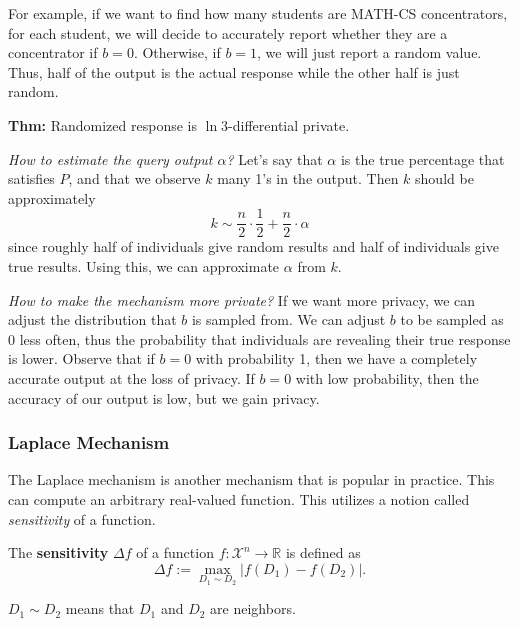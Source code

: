 
For example, if we want to find how many students are MATH-CS concentrators, for each student, we will decide to accurately report whether they are a concentrator if $b=0$. Otherwise, if $b=1$, we will just report a random value. Thus, half of the output is the actual response while the other half is just random.

\textbf{Thm:} Randomized response is $\ln 3$-differential private.

\textit{How to estimate the query output $\alpha$?} Let's say that $\alpha$ is the true percentage that satisfies $P$, and that we observe $k$ many 1's in the output. Then $k$ should be approximately
$$k \sim \frac{n}{2}\cdot\frac{1}{2} + \frac{n}{2}\cdot \alpha$$
since roughly half of individuals give random results and half of individuals give true results. Using this, we can approximate $\alpha$ from $k$.

\textit{How to make the mechanism more private?} If we want more privacy, we can adjust the distribution that $b$ is sampled from. We can adjust $b$ to be sampled as $0$ less often, thus the probability that individuals are revealing their true response is lower. Observe that if $b=0$ with probability 1, then we have a completely accurate output at the loss of privacy. If $b=0$ with low probability, then the accuracy of our output is low, but we gain privacy.

\subsubsection{Laplace Mechanism}

The Laplace mechanism is another mechanism that is popular in practice. This can compute an arbitrary real-valued function. This utilizes a notion called \textit{sensitivity} of a function.

\begin{definition}
    The \textbf{sensitivity} $\Delta f$ of a function $f: \mathcal{X}^n \to \mathbb{R}$ is defined as
    $$\Delta f := \max_{D_1 \sim D_2}|f(D_1) - f(D_2)|.$$

    $D_1\sim D_2$ means that $D_1$ and $D_2$ are neighbors.
\end{definition}

